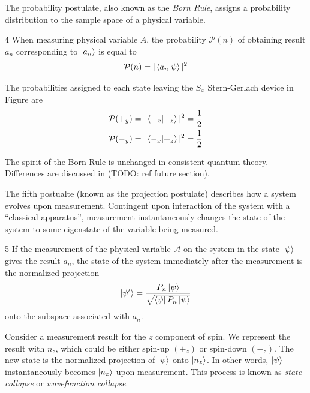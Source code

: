 The probability postulate, also known as the \textit{Born Rule}, assigns a probability distribution to the sample space of a physical variable.

\begin{Thm:Postulate}{4}
    When measuring physical variable $A$, the probability $\mathcal{P}(n)$ of obtaining result $a_n$ corresponding to $\ket{a_n}$  is equal to
     \begin{align}
        \mathcal{P}(n) = |\braket{a_n|\psi}|^2
    \end{align}
\end{Thm:Postulate}

The probabilities assigned to each state leaving the $S_x$ Stern-Gerlach device in Figure  are
\begin{align}
    \mathcal{P}(+_y) &= |\braket{+_x|+_z}|^2 = \frac{1}{2} \\
    \mathcal{P}(-_y) &= |\braket{-_x|+_z}|^2 = \frac{1}{2}
\end{align}

The spirit of the Born Rule is unchanged in consistent quantum theory. Differences are discussed in (TODO: ref future section).


The fifth postualte (known as the projection postulate) describes how a system evolves upon measurement. Contingent upon interaction of the system with a ``classical apparatus'', measurement instantaneously changes the state of the system to some eigenstate of the variable being measured.

\begin{Thm:Postulate}{5} \label{projection postulate}
    If the measurement of the physical variable $\mathcal{A}$ on the system in the state $\ket{\psi}$ gives the result $a_n$, the state of the system immediately after the measurement is the normalized projection
    \begin{align}
        \ket{\psi^\prime} = \frac{P_n\ket{\psi}}{\sqrt{\bra{\psi}P_n\ket{\psi}
        }}
    \end{align}
    onto the subspace associated with $a_n$.
\end{Thm:Postulate}

Consider a measurement result for the $z$ component of spin. We represent the result with $n_z$, which could be either spin-up $\left(+_z \right)$ or spin-down $\left(-_z \right)$. The new state is the normalized projection of $\ket{\psi}$ onto $\ket{n_z}$. In other words, $\ket{\psi}$ instantaneously becomes $\ket{n_z}$ upon measurement. This process is known as \textit{state collapse} or \textit{wavefunction collapse}.

